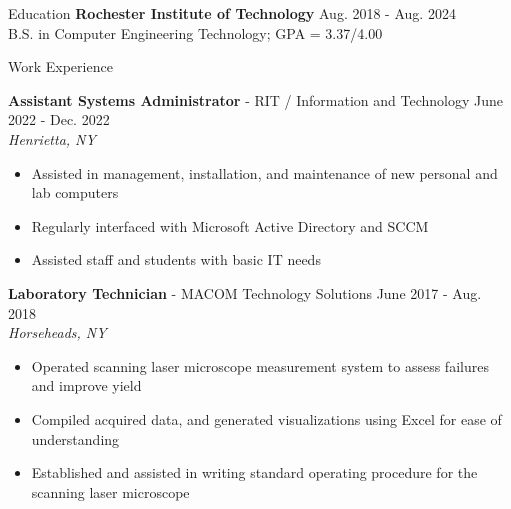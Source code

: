 \documentclass[UTF-8]{resume} \usepackage{multirow}
\begin{document}
\begin{rSection}{Education}
	{\bf Rochester Institute of Technology}  \hfill {Aug. 2018 - Aug. 2024}\\
	B.S. in Computer Engineering Technology; GPA = 3.37/4.00
\end{rSection}


        \begin{rSection}{Work Experience}
    	    \vspace{-1.6em}
        \item \textbf{Assistant Systems Administrator} {- RIT / Information and Technology } \hfill {June 2022 - Dec. 2022}\\
            \emph{Henrietta, NY}
            \begin{itemize}
                \itemsep -5pt {}
                \item Assisted in management, installation, and maintenance of new personal and lab computers
                \item Regularly interfaced with Microsoft Active Directory and SCCM
                \item Assisted staff and students with basic IT needs
            \end{itemize}
        \item \textbf{Laboratory Technician} {- MACOM Technology Solutions} \hfill {June 2017 - Aug. 2018}\\
            \emph{Horseheads, NY}
            \begin{itemize}
                \itemsep -5pt {}
                \item Operated scanning laser microscope measurement system to assess failures and improve yield
                \item Compiled acquired data, and generated visualizations using Excel for ease of understanding
                \item Established and assisted in writing standard operating procedure for the scanning laser microscope
            \end{itemize}
        \end{rSection}
\end{document}
